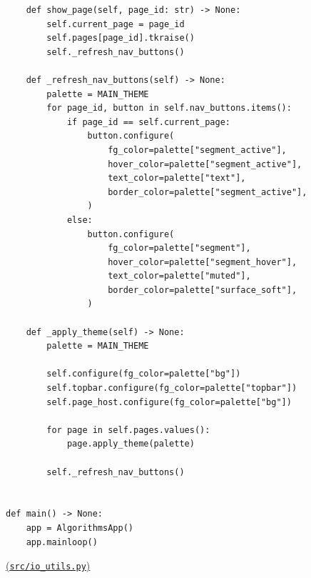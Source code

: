 \documentclass[12pt,a4paper]{article}
\begin{document}
\begin{verbatim}
    def show_page(self, page_id: str) -> None:
        self.current_page = page_id
        self.pages[page_id].tkraise()
        self._refresh_nav_buttons()

    def _refresh_nav_buttons(self) -> None:
        palette = MAIN_THEME
        for page_id, button in self.nav_buttons.items():
            if page_id == self.current_page:
                button.configure(
                    fg_color=palette["segment_active"],
                    hover_color=palette["segment_active"],
                    text_color=palette["text"],
                    border_color=palette["segment_active"],
                )
            else:
                button.configure(
                    fg_color=palette["segment"],
                    hover_color=palette["segment_hover"],
                    text_color=palette["muted"],
                    border_color=palette["surface_soft"],
                )

    def _apply_theme(self) -> None:
        palette = MAIN_THEME

        self.configure(fg_color=palette["bg"])
        self.topbar.configure(fg_color=palette["topbar"])
        self.page_host.configure(fg_color=palette["bg"])

        for page in self.pages.values():
            page.apply_theme(palette)

        self._refresh_nav_buttons()


def main() -> None:
    app = AlgorithmsApp()
    app.mainloop()
    \end{verbatim}

    \noindent
    \underline{(\texttt{src/io\_utils.py})}
\end{document}
